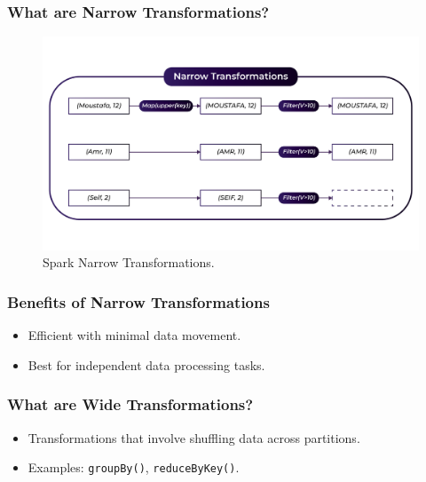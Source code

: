 \begin{frame}
    \frametitle{What are Narrow Transformations?}
    \begin{figure}
        \includegraphics[width=\textwidth,height=.75\textheight,keepaspectratio]{./Figures/chapter-04/Narrow}
        \caption{Spark Narrow Transformations.}\label{fig:spark_narrow}
    \end{figure}
\end{frame}

\begin{frame}
\frametitle{Benefits of Narrow Transformations}
\begin{itemize}
    \item Efficient with minimal data movement.
    \item Best for independent data processing tasks.
\end{itemize}
\end{frame}

\begin{frame}
\frametitle{What are Wide Transformations?}
\begin{itemize}
    \item Transformations that involve shuffling data across partitions.
    \item Examples: \texttt{groupBy()}, \texttt{reduceByKey()}.
\end{itemize}
\end{frame}

